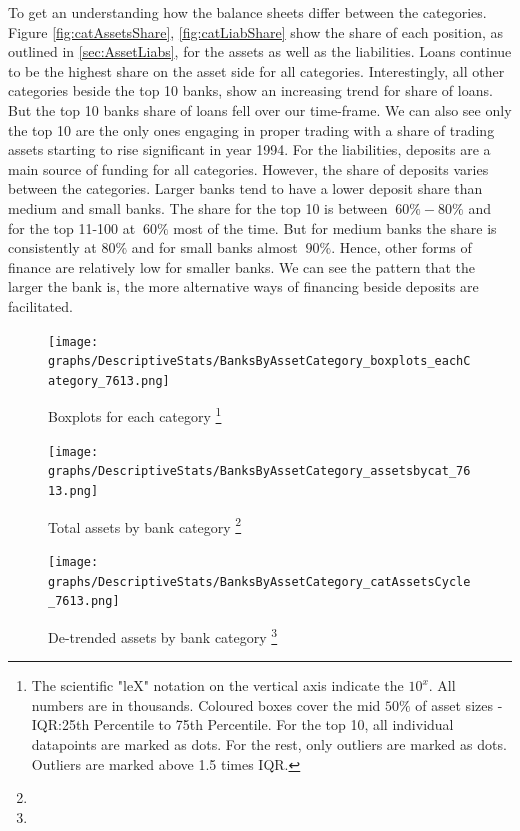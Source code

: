 \documentclass[12pt, a4paper]{article} %
\begin{document}
To get an understanding how the balance sheets differ between the categories. Figure \ref{fig:catAssetsShare}, \ref{fig:catLiabShare} show the share of each position, as outlined in \ref{sec:AssetLiabs}, for the assets as well as the liabilities. Loans continue to be the highest share on the asset side for all categories. Interestingly, all other categories beside the top 10 banks, show an increasing trend for share of loans. But the top 10 banks share of loans fell over our time-frame.  We can also see only the top 10 are the only ones engaging in proper trading with a share of trading assets starting to rise significant in year 1994.
For the liabilities, deposits are a main source of funding for all categories. However, the share of deposits varies between the categories. Larger banks tend to have a lower deposit share than medium and small banks. The share for the top 10 is between $~60\%-80\%$ and for the top 11-100 at $~60\%$ most of the time. But for medium banks the share is consistently at $80\%$ and for small banks almost $~90\%$. Hence, other forms of finance are relatively low for smaller banks. We can see the pattern that the larger the bank is, the more alternative ways of financing beside deposits are facilitated.

\begin{figure}[hbtp]
\begin{minipage}{\textwidth}
\centering
\caption[1]{Boxplots for each category \footnote{The scientific "leX" notation on the vertical axis indicate the $10^x$. All numbers are in thousands. Coloured boxes cover the mid $50\%$ of asset sizes - IQR:25th Percentile to 75th Percentile. For the top 10, all individual datapoints are marked as dots. For the rest, only outliers are marked as dots. Outliers are marked above 1.5 times IQR.} }
\texttt{[image: graphs/DescriptiveStats/BanksByAssetCategory\_boxplots\_eachCategory\_7613.png]}
\label{fig:cat_boxplot}
\end{minipage}
\end{figure}


\begin{figure}[hbtp]
\begin{minipage}{\textwidth}
\centering
\caption[1]{Total assets by bank category \footnote{} }
\texttt{[image: graphs/DescriptiveStats/BanksByAssetCategory\_assetsbycat\_7613.png]}
\label{fig:assetsbycat}
\end{minipage}
\end{figure}



\begin{figure}[hbtp]
\begin{minipage}{\textwidth}
\centering
\caption[1]{De-trended assets by bank category \footnote{} }
\texttt{[image: graphs/DescriptiveStats/BanksByAssetCategory\_catAssetsCycle\_7613.png]}
\label{fig:catassetscycle}
\end{minipage}
\end{figure}
\end{document}
